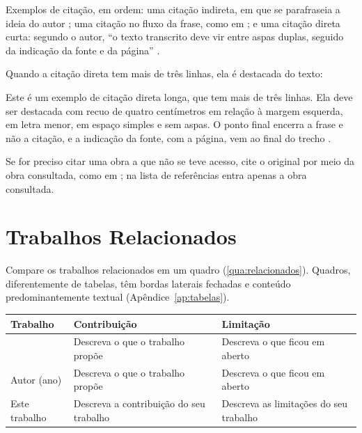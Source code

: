 Exemplos de citação, em ordem: uma citação indireta, em que se parafraseia a ideia
do autor \cite{autor2020}; uma citação no fluxo da frase, como em \textcite{autor2020};
e uma citação direta curta: segundo o autor, \enquote{o texto transcrito deve vir entre
aspas duplas, seguido da indicação da fonte e da página} \cite[p.~12]{autor2020}.

Quando a citação direta tem mais de três linhas, ela é destacada do texto:

\begin{citacao}
Este é um exemplo de citação direta longa, que tem mais de três linhas. Ela deve ser
destacada com recuo de quatro centímetros em relação à margem esquerda, em letra
menor, em espaço simples e sem aspas. O ponto final encerra a frase e não a citação,
e a indicação da fonte, com a página, vem ao final do trecho \cite[p.~35]{autor2020}.
\end{citacao}

Se for preciso citar uma obra a que não se teve acesso, cite o original por meio da
obra consultada, como em ; na lista de referências
entra apenas a obra consultada.

\section{Trabalhos Relacionados}\label{sec:TrabRel}

Compare os trabalhos relacionados em um quadro (\autoref{qua:relacionados}). Quadros,
diferentemente de tabelas, têm bordas laterais fechadas e conteúdo predominantemente
textual (Apêndice~\ref{ap:tabelas}).

\begin{quadro}[htbp]
\begin{ilustracao}{\caption{Comparação entre trabalhos relacionados}\label{qua:relacionados}}{\elaboracaopropria}
  \renewcommand{\arraystretch}{1.25}
  \begin{tabularx}{\textwidth}{|>{\raggedright\arraybackslash}p{3.2cm}|X|X|}
    \hline
    \textbf{Trabalho} & \textbf{Contribuição} & \textbf{Limitação} \\
    \hline
    \textcite{autor2020} & Descreva o que o trabalho propõe & Descreva o que ficou em aberto \\
    \hline
    Autor (ano) & Descreva o que o trabalho propõe & Descreva o que ficou em aberto \\
    \hline
    Este trabalho & Descreva a contribuição do seu trabalho & Descreva as limitações do seu trabalho \\
    \hline
  \end{tabularx}
\end{ilustracao}
\end{quadro}

